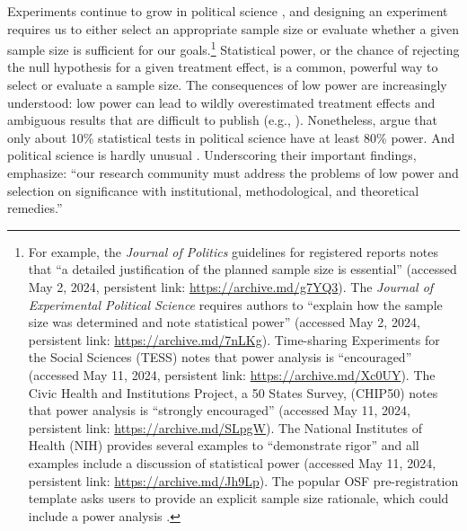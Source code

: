 \documentclass[12pt]{article}
\begin{document}
Experiments continue to grow in political science \citep{Druckman2021}, and designing an experiment requires us to either select an appropriate sample size or evaluate whether a given sample size is sufficient for our goals.\footnote{
  For example, the \emph{Journal of Politics} guidelines for registered reports notes that ``a detailed justification of the planned sample size is essential'' (accessed May 2, 2024, persistent link: \url{https://archive.md/g7YQ3}). 
  The \emph{Journal of Experimental Political Science} requires authors to ``explain how the sample size was determined and note statistical power'' (accessed May 2, 2024, persistent link: \url{https://archive.md/7nLKg}). 
  Time-sharing Experiments for the Social Sciences (TESS) notes that power analysis is ``encouraged'' (accessed May 11, 2024, persistent link: \url{https://archive.md/Xc0UY}). 
  The Civic Health and Institutions Project, a 50 States Survey, (CHIP50) notes that power analysis is ``strongly encouraged'' (accessed May 11, 2024, persistent link: \url{https://archive.md/SLpgW}). 
  The National Institutes of Health (NIH) provides several examples to ``demonstrate rigor'' and all examples include a discussion of statistical power (accessed May 11, 2024, persistent link: \url{https://archive.md/Jh9Lp}). 
  The popular OSF pre-registration template asks users to provide an explicit sample size rationale, which could include a power analysis \citep{Bowman2020}.}
Statistical power, or the chance of rejecting the null hypothesis for a given treatment effect, is a common, powerful way to select or evaluate a sample size.
The consequences of low power are increasingly understood: low power can lead to wildly overestimated treatment effects \citep{Gelman2014} and ambiguous results that are difficult to publish (e.g., \citealt{Alrababah2023}). 
Nonetheless, \cite{ArelBundock2022} argue that only about 10\% statistical tests in political science have at least 80\% power. 
And political science is hardly unusual \citep{Cohen1962, Button2013, Ioannidis2017, Stanley2018, Yang2023, Stommes2023}.
Underscoring their important findings, \cite{ArelBundock2022} emphasize: ``our research community must address the problems of low power and selection on significance with institutional, methodological, and theoretical remedies.''
\end{document}
